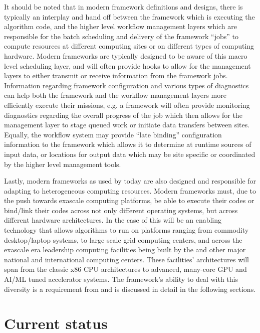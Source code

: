 \documentclass[../main-v1.tex]{subfiles}
\begin{document}
It should be noted that in modern framework definitions and designs, there is typically an interplay and hand off between the framework which is executing the algorithm code, and the higher level workflow management layers which are responsible for the batch scheduling and delivery of the framework ``jobs'' to compute resources at different computing sites or on different types of computing hardware.  Modern frameworks are typically designed to be aware of this macro level scheduling layer, and will often provide hooks to allow for the management layers to either transmit or receive information from the framework jobs. Information regarding framework configuration and various types of diagnostics can help both the framework and the workflow management layers more efficiently execute their missions, e.g. a framework will often provide monitoring diagnostics regarding the overall progress of the job which then allows for the management layer to stage queued work or initiate data transfers between sites.  Equally, the workflow system may provide ``late binding'' configuration information to the framework which allows it to determine at runtime sources of input data, or locations for output data which may be site specific or coordinated by the higher level management tools.

Lastly, modern frameworks as used by  today are also designed and responsible for adapting to  heterogeneous computing resources.  Modern frameworks must, due to the push towards exascale computing platforms, be able to execute their codes or bind/link their codes across not only different operating systems, but across different hardware architectures.   In the case of  this will be an enabling technology that allows  algorithms to run on platforms ranging from commodity desktop/laptop systems, to large scale grid computing centers, and across the exascale era leadership computing facilities being built by the  and other major national and international computing centers. These facilities' architectures will span from the classic x86 CPU architectures to advanced, many-core GPU and AI/ML tuned accelerator systems.  The framework's ability to deal with this diversity is a requirement from  and is discussed in detail in the following sections.

\section{Current status}\label{sec:framework:status}
\end{document}
